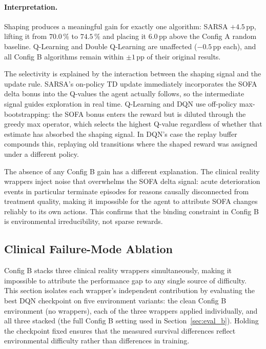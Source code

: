 \documentclass[11pt,a4paper]{article}
\begin{document}
\paragraph{Interpretation.}
Shaping produces a meaningful gain for exactly one algorithm: SARSA $+4.5$\,pp,
lifting it from $70.0\,\%$ to $74.5\,\%$ and placing it $6.0$\,pp above the
Config A random baseline. Q-Learning and Double Q-Learning are unaffected
($-0.5$\,pp each), and all Config B algorithms remain within $\pm1$\,pp of
their original results.

The selectivity is explained by the interaction between the shaping signal and
the update rule. SARSA's on-policy TD update immediately incorporates the SOFA
delta bonus into the Q-values the agent actually follows, so the intermediate
signal guides exploration in real time. Q-Learning and DQN use off-policy
max-bootstrapping: the SOFA bonus enters the reward but is diluted through the
greedy max operator, which selects the highest Q-value regardless of whether
that estimate has absorbed the shaping signal. In DQN's case the replay buffer
compounds this, replaying old transitions where the shaped reward was assigned
under a different policy.

The absence of any Config B gain has a different explanation. The clinical
reality wrappers inject noise that overwhelms the SOFA delta signal: acute
deterioration events in particular terminate episodes for reasons causally
disconnected from treatment quality, making it impossible for the agent to
attribute SOFA changes reliably to its own actions. This confirms that the
binding constraint in Config B is environmental irreducibility, not sparse
rewards.

\subsection{Clinical Failure-Mode Ablation}
\label{sec:ablation}

Config B stacks three clinical reality wrappers simultaneously, making it
impossible to attribute the performance gap to any single source of difficulty.
This section isolates each wrapper's independent contribution by evaluating
the best DQN checkpoint on five environment variants: the clean Config B
environment (no wrappers), each of the three wrappers applied individually,
and all three stacked (the full Config B setting used in Section~\ref{sec:eval_b}).
Holding the checkpoint fixed ensures that the measured survival differences
reflect environmental difficulty rather than differences in training.
\end{document}
